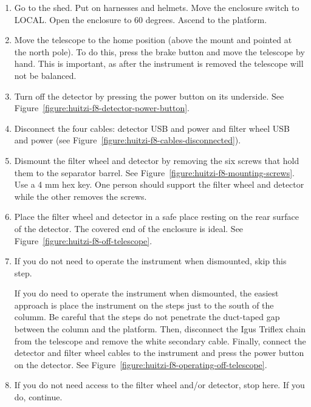 \begin{enumerate}

    \item Go to the shed. Put on harnesses and helmets. Move the enclosure switch to LOCAL. Open the enclosure to 60 degrees. Ascend to the platform.

    \item Move the telescope to the home position (above the mount and pointed at the north pole). To do this, press the brake button and move the telescope by hand. This is important, as after the instrument is removed the telescope will not be balanced.

    \item Turn off the detector by pressing the power button on its underside. See Figure~\ref{figure:huitzi-f8-detector-power-button}.

    \item Disconnect the four cables: detector USB and power and filter wheel USB and power (see Figure~\ref{figure:huitzi-f8-cables-disconnected}).

    \item Dismount the filter wheel and detector by removing the six screws that hold them to the separator barrel. See Figure~\ref{figure:huitzi-f8-mounting-screws}. Use a 4 mm hex key.  One person should support the filter wheel and detector while the other removes the screws.

    \item Place the filter wheel and detector in a safe place resting on the rear surface of the detector. The covered end of the enclosure is ideal. See Figure~\ref{figure:huitzi-f8-off-telescope}.

    \item If you do not need to operate the instrument when dismounted, skip this step.
    
    If you do need to operate the instrument when dismounted, the easiest approach is place the instrument on the steps just to the south of the columm. Be careful that the steps do not penetrate the duct-taped gap between the column and the platform.
    Then, disconnect the Igus Triflex chain from the telescope and remove the white secondary cable. Finally, connect the detector and filter wheel cables to the instrument and press the power button on the detector. See Figure~\ref{figure:huitzi-f8-operating-off-telescope}.
    
    \item If you do not need access to the filter wheel and/or detector, stop here.  If you do, continue.
    

\end{enumerate}
